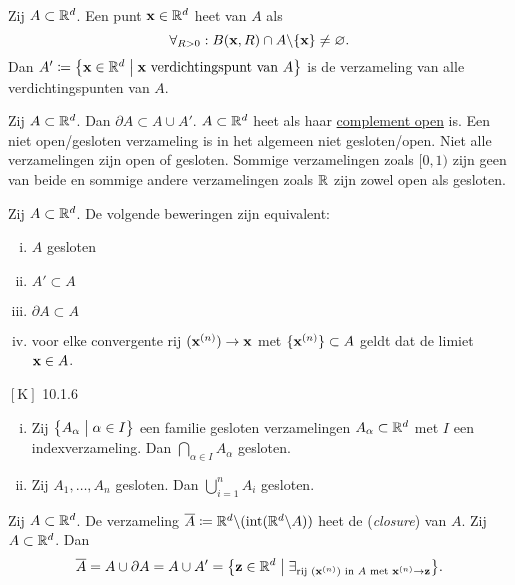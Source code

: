 \documentclass{2wa40summary}
\begin{document}
	 Zij $A \subset \mathbb{R}^d$. Een punt ${\textbf{x}} \in \mathbb{R}^d$ heet  van $A$ als \[\forall _{R>0}:B({\textbf{x}},R)\cap  A \backslash\{{\textbf{x}}\} \neq \varnothing.\]
	Dan $A'\coloneqq \big\{ {\textbf{x}} \in \mathbb{R}^d \bigm| {\textbf{x}} \text{ verdichtingspunt van } A\big\}$ is de verzameling van
	alle verdichtingspunten van $A$.
	
	\lemma Zij $A \subset \mathbb{R}^d$. Dan $\partial A \subset A\cup A'$.
	 $A \subset \mathbb{R}^d$ heet  als haar \underline{complement open} is.
	\valkuil Een niet open/gesloten verzameling is in het algemeen niet gesloten/open.
	Niet alle verzamelingen zijn open of gesloten. Sommige verzamelingen zoals $[0,1)$ zijn geen van beide
	en sommige andere verzamelingen zoals $\mathbb{R}$ zijn zowel open als gesloten.
	
	 Zij $A \subset \mathbb{R}^d$. De volgende beweringen zijn equivalent:
	\begin{enumerate}[(i)]
		\item $A$ gesloten
		\item $A'\subset A$
		\item $\partial A \subset A$
		\item voor elke convergente rij $({\textbf{x}}^{(n)})\to{\textbf{x}}$ met $\lbrace{\textbf{x}}^{(n)}\rbrace\subset A$ geldt dat de limiet ${\textbf{x}}\in A$.%
	\end{enumerate}
	
	\theorem $\left[\text{K}\right]$ 10.1.6
	\begin{enumerate}[(i)]
		\item Zij $\big\{ A_\alpha \bigm| \alpha \in I \big\}$ een familie gesloten verzamelingen $A_\alpha \subset \mathbb{R}^d$ met $I$ een indexverzameling. Dan $\bigcap_{\alpha \in I}A_\alpha$ gesloten.
		\item Zij $A_1, \dots ,A_n$ gesloten. Dan $\bigcup_{i=1}^n A_i$ gesloten.
	\end{enumerate}
	
	 Zij $A \subset \mathbb{R}^d$. De verzameling $\overline{A}\coloneqq  \mathbb{R}^d \backslash (\operatorname{\mathop{int}} (\mathbb{R}^d \backslash A))$ heet de  (\textit{closure}) van $A$.
	Zij $A \subset \mathbb{R}^d$. Dan
	\[\overline{A}= A \cup \partial A = A \cup A'= \big\{{\textbf{z}} \in \mathbb{R}^d \bigm| \exists _{\text{rij } ({\textbf{x}}^{(n)}) \text{ in } A \text{ met } {\textbf{x}}^{(n)} \to {\textbf{z}}} \big\}.\]
	
\end{document}
